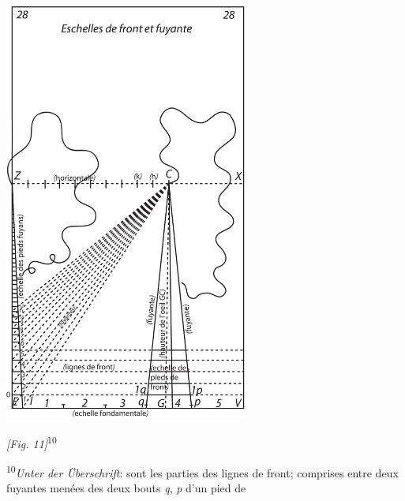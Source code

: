 \begin{center}
\includegraphics[width=0.6\textwidth]{images/T28-Desargues}\\\rule[-4mm]{0mm}{10mm}\textit{[Fig. 11]}\textsuperscript{10}
\end{center}
\footnoterule %
\pstart\hspace{-10pt}\textsuperscript{10}\textit{Unter der \"{U}berschrift}:  sont les parties des lignes de front; comprises entre deux fuyantes\protect{} men\'{e}es des deux bouts \textit{q}, \textit{p} d'un pied de
\\
\footnoterule\\
